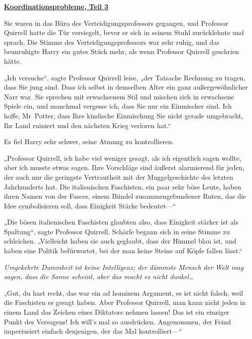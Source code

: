 

\hypertarget{koordinationsprobleme-teil-3}{%

\textbf{\uline{Koordinationsprobleme, Teil 3}}

Sie waren in das Büro des Verteidigungsprofessors gegangen, und Professor Quirrell hatte die Tür versiegelt, bevor er sich in seinem Stuhl zurücklehnte und sprach. Die Stimme des Verteidigungsprofessors war sehr ruhig, und das beunruhigte Harry ein gutes Stück mehr, als wenn Professor Quirrell geschrien hätte.

„Ich versuche“, sagte Professor Quirrell leise, „der Tatsache Rechnung zu tragen, dass Sie jung sind. Dass ich selbst in demselben Alter ein ganz außergewöhnlicher Narr war. Sie sprechen mit erwachsenem Stil und mischen sich in erwachsene Spiele ein, und manchmal vergesse ich, dass Sie nur ein Einmischer sind. Ich hoffe, Mr~Potter, dass Ihre kindische Einmischung Sie nicht gerade umgebracht, Ihr Land ruiniert und den nächsten Krieg verloren hat.“

Es fiel Harry sehr schwer, seine Atmung zu kontrollieren.

„Professor Quirrell, ich habe viel weniger gesagt, als ich eigentlich sagen wollte, aber ich musste etwas sagen. Ihre Vorschläge sind äußerst alarmierend für jeden, der auch nur die geringste Vertrautheit mit der Muggelgeschichte des letzten Jahrhunderts hat. Die italienischen Faschisten, ein paar sehr böse Leute, haben ihren Namen von der Fasces, einem Bündel zusammengebundener Ruten, das die Idee symbolisieren soll, dass Einigkeit Stärke bedeutet—“

„Die bösen italienischen Faschisten glaubten also, dass Einigkeit stärker ist als Spaltung“, sagte Professor Quirrell. Schärfe begann sich in seine Stimme zu schleichen. „Vielleicht haben sie auch geglaubt, dass der Himmel blau ist, und haben eine Politik befürwortet, bei der man keine Steine auf Köpfe fallen lässt.“

\emph{Umgekehrte Dummheit ist keine Intelligenz; der dümmste Mensch der Welt mag sagen, dass die Sonne scheint, aber das macht es nicht dunkel…}

„Gut, du hast recht, das war ein ad hominem Argument, es ist nicht falsch, weil die Faschisten es gesagt haben. Aber Professor Quirrell, man kann nicht jeden in einem Land das Zeichen eines Diktators nehmen lassen! Das ist ein einziger Punkt des Versagens! Ich will's mal so ausdrücken. Angenommen, der Feind imperiusiert einfach denjenigen, der das Mal kontrolliert—“

}
